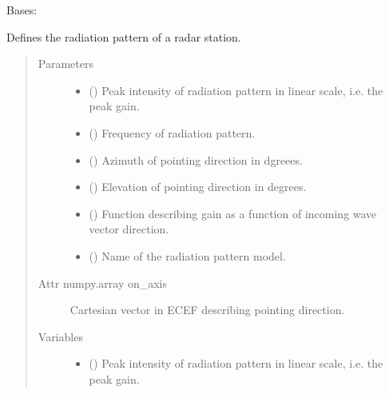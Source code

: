 \documentclass[letterpaper,10pt,english]{sphinxmanual}
\begin{document}
\begin{fulllineitems}
\label{\detokenize{modules/antenna:antenna.BeamPattern}}
Bases: 

Defines the radiation pattern of a radar station.
\begin{quote}\begin{description}
\item[{Parameters}] \leavevmode\begin{itemize}
\item {} 
 () \textendash{} Peak intensity of radiation pattern in linear scale, i.e. the peak gain.

\item {} 
 () \textendash{} Frequency of radiation pattern.

\item {} 
 () \textendash{} Azimuth of pointing direction in dgreees.

\item {} 
 () \textendash{} Elevation of pointing direction in degrees.

\item {} 
 () \textendash{} Function describing gain as a function of incoming wave vector direction.

\item {} 
 () \textendash{} Name of the radiation pattern model.

\end{itemize}

\item[{Attr numpy.array on\_axis}] \leavevmode
Cartesian vector in ECEF describing pointing direction.

\item[{Variables}] \leavevmode\begin{itemize}
\item {} 
 () \textendash{} Peak intensity of radiation pattern in linear scale, i.e. the peak gain.


\end{itemize}
\end{description}
\end{quote}
\end{fulllineitems}
\end{document}
